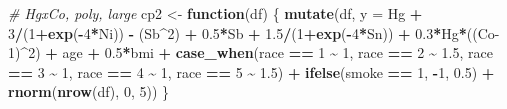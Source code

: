 \documentclass[12pt, twoside]{amherstthesis}
\newenvironment{Shaded}{\begin{snugshade}}{\end{snugshade}}
\newcommand{\AttributeTok}[1]{\textcolor[rgb]{0.13,0.29,0.53}{#1}}
\newcommand{\CommentTok}[1]{\textcolor[rgb]{0.56,0.35,0.01}{\textit{#1}}}
\newcommand{\ControlFlowTok}[1]{\textcolor[rgb]{0.13,0.29,0.53}{\textbf{#1}}}
\newcommand{\DecValTok}[1]{\textcolor[rgb]{0.00,0.00,0.81}{#1}}
\newcommand{\FloatTok}[1]{\textcolor[rgb]{0.00,0.00,0.81}{#1}}
\newcommand{\FunctionTok}[1]{\textcolor[rgb]{0.13,0.29,0.53}{\textbf{#1}}}
\newcommand{\NormalTok}[1]{#1}
\newcommand{\OtherTok}[1]{\textcolor[rgb]{0.56,0.35,0.01}{#1}}
\newcommand{\SpecialCharTok}[1]{\textcolor[rgb]{0.81,0.36,0.00}{\textbf{#1}}}
\begin{document}
\begin{Shaded}
\begin{Highlighting}[]
\CommentTok{\# HgxCo, poly, large}
\NormalTok{cp2 }\OtherTok{\textless{}{-}} \ControlFlowTok{function}\NormalTok{(df) \{}
  \FunctionTok{mutate}\NormalTok{(df, }\AttributeTok{y =} 
\NormalTok{           Hg }\SpecialCharTok{+} \DecValTok{3}\SpecialCharTok{/}\NormalTok{(}\DecValTok{1}\SpecialCharTok{+}\FunctionTok{exp}\NormalTok{(}\SpecialCharTok{{-}}\DecValTok{4}\SpecialCharTok{*}\NormalTok{Ni)) }\SpecialCharTok{{-}}\NormalTok{ (Sb}\SpecialCharTok{\^{}}\DecValTok{2}\NormalTok{) }\SpecialCharTok{+} \FloatTok{0.5}\SpecialCharTok{*}\NormalTok{Sb }\SpecialCharTok{+} \FloatTok{1.5}\SpecialCharTok{/}\NormalTok{(}\DecValTok{1}\SpecialCharTok{+}\FunctionTok{exp}\NormalTok{(}\SpecialCharTok{{-}}\DecValTok{4}\SpecialCharTok{*}\NormalTok{Sn)) }\SpecialCharTok{+} 
           \FloatTok{0.3}\SpecialCharTok{*}\NormalTok{Hg}\SpecialCharTok{*}\NormalTok{((Co}\DecValTok{{-}1}\NormalTok{)}\SpecialCharTok{\^{}}\DecValTok{2}\NormalTok{) }\SpecialCharTok{+}
\NormalTok{           age }\SpecialCharTok{+} \FloatTok{0.5}\SpecialCharTok{*}\NormalTok{bmi }\SpecialCharTok{+} 
           \FunctionTok{case\_when}\NormalTok{(race }\SpecialCharTok{==} \DecValTok{1} \SpecialCharTok{\textasciitilde{}} \DecValTok{1}\NormalTok{, }
\NormalTok{                     race }\SpecialCharTok{==} \DecValTok{2} \SpecialCharTok{\textasciitilde{}} \FloatTok{1.5}\NormalTok{, }
\NormalTok{                     race }\SpecialCharTok{==} \DecValTok{3} \SpecialCharTok{\textasciitilde{}} \DecValTok{1}\NormalTok{, }
\NormalTok{                     race }\SpecialCharTok{==} \DecValTok{4} \SpecialCharTok{\textasciitilde{}} \DecValTok{1}\NormalTok{, }
\NormalTok{                     race }\SpecialCharTok{==} \DecValTok{5} \SpecialCharTok{\textasciitilde{}} \FloatTok{1.5}\NormalTok{) }\SpecialCharTok{+}
           \FunctionTok{ifelse}\NormalTok{(smoke }\SpecialCharTok{==} \DecValTok{1}\NormalTok{, }\SpecialCharTok{{-}}\DecValTok{1}\NormalTok{, }\FloatTok{0.5}\NormalTok{) }\SpecialCharTok{+}
           \FunctionTok{rnorm}\NormalTok{(}\FunctionTok{nrow}\NormalTok{(df), }\DecValTok{0}\NormalTok{, }\DecValTok{5}\NormalTok{))}
\NormalTok{\}}


\end{Highlighting}
\end{Shaded}
\end{document}
